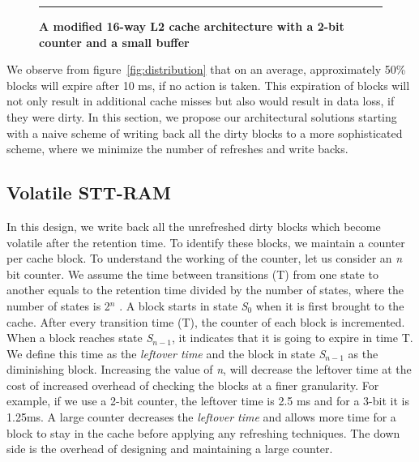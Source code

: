 
\begin{figure*} [t]
\center
 \hrule
 \caption{\label{fig:architecture} \scriptsize \bf A modified 16-way L2 cache architecture with a 2-bit counter and a small buffer}
\end{figure*}


We observe from figure~\ref{fig:distribution} that on an average, approximately 50\% blocks will
expire after 10 ms, if no action is taken. This expiration of blocks will not only result in additional cache misses
but also would
result in data loss, if they were dirty. In this section, we propose our architectural solutions starting with
a naive scheme of writing back
all the dirty blocks to a more sophisticated scheme, where we minimize the number of refreshes and write backs.

\subsection{{Volatile STT-RAM}}
In this design, we write back all the unrefreshed dirty blocks which become volatile after the retention time.
To identify these blocks,
we maintain a counter per cache block.  To understand the working of the counter, let us consider an {\it n} bit
counter. We assume the time between transitions (T) from one state to another equals to the retention time
divided by the number of states, where the number of states is 2$^n$ .
A block starts in state {\it S$_0$} when it is first brought to the cache. After every transition time (T),
the counter of each block is incremented.
When a block reaches  state {\it S$_{n-1}$}, it indicates that it is going to expire in time T.
We define this time as the {\it leftover time} and the block in state {\it S$_{n-1}$} as  the diminishing block.
Increasing the value of {\it n}, will decrease the leftover time at the cost of increased overhead of checking
the blocks at a finer granularity.
For example, if we use a 2-bit counter, the leftover time is 2.5 ms and for a 3-bit it is 1.25ms.
A large counter decreases the {\it leftover time} and allows more time for a block to stay in the cache
before applying any refreshing techniques. The down side is the overhead of designing and maintaining a large counter.

